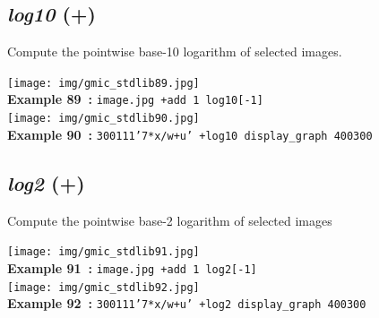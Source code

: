 \documentclass[a4paper,10.5pt,twoside]{book}
\def\comma{\discretionary{,}{}{,}}
\begin{document}
\subsection{\emph{log10} (+)}\vspace*{-0.7em}
Compute the pointwise base-10 logarithm of selected images.
\begin{center}\texttt{[image: img/gmic\_stdlib89.jpg]}\\
{\footnotesize \textbf{Example 89~:} \texttt{image.jpg +add 1 log10[-1]}}
\\\texttt{[image: img/gmic\_stdlib90.jpg]}\\
{\footnotesize \textbf{Example 90~:} \texttt{300{\comma}1{\comma}1{\comma}1{\comma}'7*x/w+u' +log10 display\_graph 400{\comma}300}}
\end{center}

\subsection{\emph{log2} (+)}\vspace*{-0.7em}
Compute the pointwise base-2 logarithm of selected images
\begin{center}\texttt{[image: img/gmic\_stdlib91.jpg]}\\
{\footnotesize \textbf{Example 91~:} \texttt{image.jpg +add 1 log2[-1]}}
\\\texttt{[image: img/gmic\_stdlib92.jpg]}\\
{\footnotesize \textbf{Example 92~:} \texttt{300{\comma}1{\comma}1{\comma}1{\comma}'7*x/w+u' +log2 display\_graph 400{\comma}300}}
\end{center}
\end{document}
